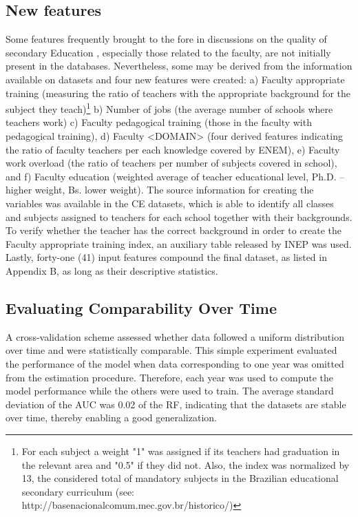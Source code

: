 \subsection{New features}
Some features frequently brought to the fore in discussions on the quality of secondary Education \cite{OCDE2013PISAPractices}, especially those related to the faculty, are not initially present in the databases. Nevertheless, some may be derived from the information available on datasets and four new features were created: a) Faculty appropriate training   (measuring the ratio of teachers with the appropriate background for the subject they teach)\footnote{For each subject a weight "1" was assigned if its teachers had graduation in the relevant area and "0.5" if they did not. Also, the index was normalized by 13, the considered total of mandatory subjects in the Brazilian educational secondary curriculum (see: http://basenacionalcomum.mec.gov.br/historico/)} b) Number of jobs (the average number of schools where teachers work) c) Faculty pedagogical training (those in the faculty with pedagogical training), d) Faculty <DOMAIN> (four derived features indicating the ratio of faculty teachers per each knowledge covered by ENEM), e) Faculty work overload (the ratio of teachers per number of subjects covered in school), and f) Faculty education (weighted average of teacher educational level, Ph.D. – higher weight, Bs. lower weight). The source information for creating the variables was available in the CE datasets, which is able to identify all classes and subjects assigned to teachers for each school together with their backgrounds. To verify whether the teacher has the correct background in order to create the Faculty appropriate training index, an auxiliary table released by INEP was used. Lastly, forty-one (41) input features compound the final dataset, as listed in Appendix B, as long as their descriptive statistics.

\subsection{Evaluating Comparability Over Time}

A cross-validation scheme assessed whether data followed a uniform distribution over time and were statistically comparable. This simple experiment evaluated the performance of the model when data corresponding to one year was omitted from the estimation procedure. Therefore, each year was used to compute the model performance while the others were used to train. The average standard deviation of the AUC was 0.02 of the RF, indicating that the datasets are stable over time, thereby enabling a good generalization.  

